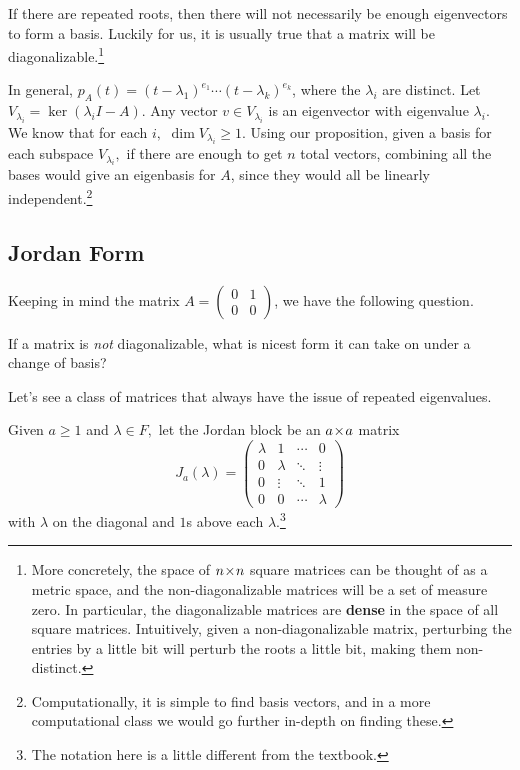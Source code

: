 If there are repeated roots, then there will not necessarily be enough eigenvectors to form a basis. Luckily for us, it is usually true that a matrix will be diagonalizable.\footnote{More concretely, the space of $n \hspace{0.05em}{\times}\hspace{0.05em} n$ square matrices can be thought of as a metric space, and the non-diagonalizable matrices will be a set of measure zero. In particular, the diagonalizable matrices are \textbf{dense} in the space of all square matrices. Intuitively, given a non-diagonalizable matrix, perturbing the entries by a little bit will perturb the roots a little bit, making them non-distinct.}

In general, $p_A(t) = (t-\lambda_1)^{e_1}\cdots(t-\lambda_k)^{e_k}$, where the $\lambda_i$ are distinct. Let $V_{\lambda_i} = \ker(\lambda_i I - A).$ Any vector $v \in V_{\lambda_i}$ is an eigenvector with eigenvalue $\lambda_i.$ We know that for each $i,$ $\dim V_{\lambda_i} \geq 1$. Using our proposition, given a basis for each subspace $V_{\lambda_i},$ if there are enough to get $n$ total vectors, combining all the bases would give an eigenbasis for $A$, since they would all be linearly independent.\footnote{Computationally, it is simple to find basis vectors, and in a more computational class we would go further in-depth on finding these.} 

\subsection{Jordan Form}

Keeping in mind the matrix $A = \begin{pmatrix}
0 & 1 \\ 0 & 0
\end{pmatrix}$, we have the following question.
\begin{qq}
If a matrix is \emph{not} diagonalizable, what is nicest form it can take on under a change of basis?
\end{qq}

Let's see a class of matrices that always have the issue of repeated eigenvalues.
\begin{definition}
Given $a \geq 1$ and $\lambda \in F,$ let the Jordan block be an $a \hspace{0.05em}{\times}\hspace{0.05em} a$ matrix \[
J_a(\lambda) = \begin{pmatrix}
\lambda & 1 & \cdots & 0 \\
0 & \lambda & \ddots & \vdots \\
0 & \vdots & \ddots & 1 \\
0 & 0& \cdots & \lambda
\end{pmatrix}
\]
with $\lambda$ on the diagonal and $1$s above each $\lambda$.\footnote{The notation here is a little different from the textbook.}
\end{definition}

